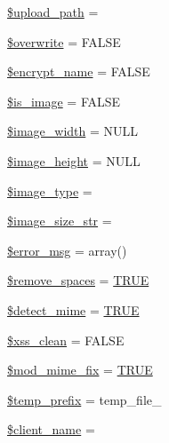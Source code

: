 \begin{DoxyCompactItemize}
\item 
\mbox{\hyperlink{class_c_i___upload_a38507bf82f955d4b13642a3c7fd6e773}{\$upload\+\_\+path}} = \textquotesingle{}\textquotesingle{}
\item 
\mbox{\hyperlink{class_c_i___upload_a8d31b0ad9cccde7e2d857097672ed6cf}{\$overwrite}} = F\+A\+L\+SE
\item 
\mbox{\hyperlink{class_c_i___upload_a54a751add0762edd4da11373e3b56687}{\$encrypt\+\_\+name}} = F\+A\+L\+SE
\item 
\mbox{\hyperlink{class_c_i___upload_a4dae8ae20ed5fdf406554e1911065753}{\$is\+\_\+image}} = F\+A\+L\+SE
\item 
\mbox{\hyperlink{class_c_i___upload_a8dadc2d2dcc0f25529a2d1e080d08169}{\$image\+\_\+width}} = N\+U\+LL
\item 
\mbox{\hyperlink{class_c_i___upload_af1b0485025a4c66fa3b2fc442df02d72}{\$image\+\_\+height}} = N\+U\+LL
\item 
\mbox{\hyperlink{class_c_i___upload_a939d6733d998cce893403d2f59f40317}{\$image\+\_\+type}} = \textquotesingle{}\textquotesingle{}
\item 
\mbox{\hyperlink{class_c_i___upload_a3a1769072af8ab3b0c5d6e0c1a1ae2ef}{\$image\+\_\+size\+\_\+str}} = \textquotesingle{}\textquotesingle{}
\item 
\mbox{\hyperlink{class_c_i___upload_acf910733622c1fa671b9f755c69c2ec7}{\$error\+\_\+msg}} = array()
\item 
\mbox{\hyperlink{class_c_i___upload_ad9f32a52b4b2c16e42a007e0fa832721}{\$remove\+\_\+spaces}} = \mbox{\hyperlink{constants_8php_ae04a3efe6aa42044f803ee90c2277846}{T\+R\+UE}}
\item 
\mbox{\hyperlink{class_c_i___upload_a50f6c723a0c96d773ecff982e7117a5f}{\$detect\+\_\+mime}} = \mbox{\hyperlink{constants_8php_ae04a3efe6aa42044f803ee90c2277846}{T\+R\+UE}}
\item 
\mbox{\hyperlink{class_c_i___upload_a0f2ee8861c0b3164a5c6e126dd98c0cc}{\$xss\+\_\+clean}} = F\+A\+L\+SE
\item 
\mbox{\hyperlink{class_c_i___upload_a5f54983a6ad24a5ee5c4ff5d9de48d83}{\$mod\+\_\+mime\+\_\+fix}} = \mbox{\hyperlink{constants_8php_ae04a3efe6aa42044f803ee90c2277846}{T\+R\+UE}}
\item 
\mbox{\hyperlink{class_c_i___upload_ab38888cba65ae75bbc5b3841bc69d64a}{\$temp\+\_\+prefix}} = \textquotesingle{}temp\+\_\+file\+\_\+\textquotesingle{}
\item 
\mbox{\hyperlink{class_c_i___upload_a3b81ba4d3535269e20e0b4a2ddab2edc}{\$client\+\_\+name}} = \textquotesingle{}\textquotesingle{}
\end{DoxyCompactItemize}
